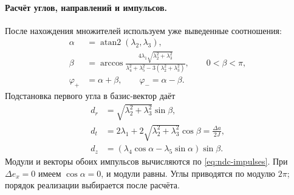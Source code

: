 \paragraph{Расчёт углов, направлений и импульсов.}
После нахождения множителей используем уже выведенные соотношения:
\begin{equation}
\begin{aligned}
 \alpha&=\operatorname{atan2}(\lambda_2,\lambda_3),\\
 \beta&=\arccos\frac{4\lambda_1\sqrt{\lambda_2^2+\lambda_3^2}}
      {\lambda_4^2+\lambda_5^2-3(\lambda_2^2+\lambda_3^2)},
            \qquad 0<\beta<\pi,\\
 \varphi_+&=\alpha+\beta,\qquad\varphi_-=\alpha-\beta.
\end{aligned}
\label{eq:ndc-angles}
\end{equation}
Подстановка первого угла в базис-вектор даёт
\begin{equation}
\begin{aligned}
 d_r&=\sqrt{\lambda_2^2+\lambda_3^2}\sin\beta,\\
 d_t&=2\lambda_1+2\sqrt{\lambda_2^2+\lambda_3^2}\cos\beta
               =\frac{\Delta a}{2J},\\
 d_z&=(\lambda_4\cos\alpha-\lambda_5\sin\alpha)\sin\beta.
\end{aligned}
\label{eq:ndc-directions}
\end{equation}
Модули и векторы обоих импульсов вычисляются по
\eqref{eq:ndc-impulses}. При $\Delta e_x=0$ имеем
$\cos\alpha=0$, и модули равны. Углы приводятся по модулю $2\pi$;
порядок реализации выбирается после расчёта.

